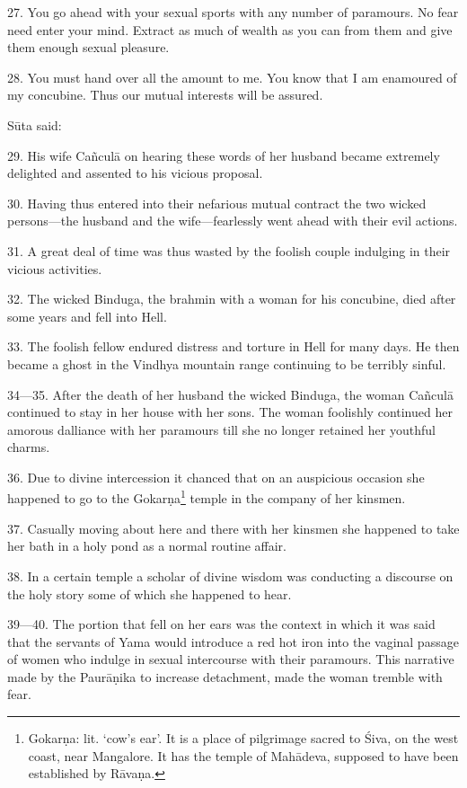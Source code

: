 27. You go ahead with your sexual sports with any number of paramours. No fear
need enter your mind. Extract as much of wealth as you can from them and give
them enough sexual pleasure.

28. You must hand over all the amount to me. You know that I am enamoured of my
concubine. Thus our mutual interests will be assured.

Sūta said:

29. His wife Cañculā on hearing these words of her husband became extremely
delighted and assented to his vicious proposal.

30. Having thus entered into their nefarious mutual contract the two wicked
persons—the husband and the wife—fearlessly went ahead with their evil actions.

31. A great deal of time was thus wasted by the foolish couple indulging in
their vicious activities.

32. The wicked Binduga, the brahmin with a  woman for his concubine,
died after some years and fell into Hell.

33. The foolish fellow endured distress and torture in Hell for many days. He
then became a ghost in the Vindhya mountain range continuing to be terribly
sinful.

34—35. After the death of her husband the wicked Binduga, the woman Cañculā
continued to stay in her house with her sons. The woman foolishly continued her
amorous dalliance with her paramours till she no longer retained her youthful
charms.

36. Due to divine intercession it chanced that on an auspicious occasion she
happened to go to the Gokarṇa\footnote{Gokarṇa: lit. ‘cow’s ear’. It is a place
of pilgrimage sacred to Śiva, on the west coast, near Mangalore. It has the
temple of Mahādeva, supposed to have been established by Rāvaṇa.} temple in the
company of her kinsmen.

37. Casually moving about here and there with her kinsmen she happened to take
her bath in a holy pond as a normal routine affair.

38. In a certain temple a scholar of divine wisdom was conducting a discourse on
the holy  story some of which she happened to hear.

39—40. The portion that fell on her ears was the context in which it was said
that the servants of Yama would introduce a red hot iron into the vaginal
passage of women who indulge in sexual intercourse with their paramours. This
narrative made by the Paurāṇika to increase detachment, made the woman tremble
with fear.

